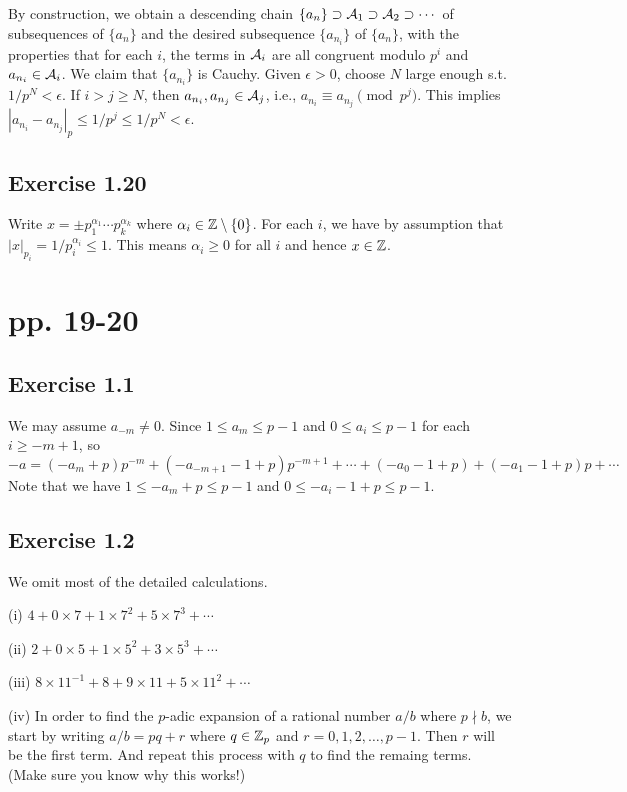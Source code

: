 \documentclass[../Koblitz.tex]{subfiles}
\begin{document}
By construction, we obtain a descending chain $\{a_n\}\supset\mathcal{A}_1\supset\mathcal{A}_2\supset\cdots$ of subsequences of $\{a_n\}$ and the desired subsequence $\{a_{n_i}\}$ of $\{a_n\}$, with the properties that for each $i$, the terms in $\mathcal{A}_i$ are all congruent modulo $p^i$ and $a_{n_i}\in\mathcal{A}_i$. We claim that $\{a_{n_i}\}$ is Cauchy. Given $\epsilon>0$, choose $N$ large enough s.t. $1/p^N<\epsilon$. If $i>j\geq N$, then $a_{n_i},a_{n_j}\in\mathcal{A}_j$, i.e., $a_{n_i}\equiv a_{n_j} \pmod{p^j}$. This implies $|a_{n_i}-a_{n_j}|_p \leq 1/p^j \leq 1/p^N < \epsilon$.

\subsection*{Exercise 1.20}

Write $x=\pm p_1^{\alpha_1}\cdots p_k^{\alpha_k}$ where $\alpha_i\in\mathbb{Z}\setminus\{0\}$. For each $i$, we have by assumption that $|x|_{p_i} = 1/p_i^{\alpha_i} \leq 1$. This means $\alpha_i \geq 0$ for all $i$ and hence $x\in\mathbb{Z}$.

\section*{pp. 19-20}

\subsection*{Exercise 1.1}
We may assume $a_{-m}\neq0$. Since $1\leq a_m \leq p-1$ and $0\leq a_i \leq p-1$ for each $i\geq-m+1$, so
$$-a = (-a_m+p)p^{-m}+(-a_{-m+1}-1+p)p^{-m+1}+\cdots+(-a_0-1+p)+(-a_1-1+p)p+\cdots$$
Note that we have $1\leq -a_m+p\leq p-1$ and $0\leq -a_i-1+p\leq p-1$.

\subsection*{Exercise 1.2}

We omit most of the detailed calculations.

(i) $4+0\times7+1\times7^2+5\times7^3+\cdots$

(ii) $2+0\times5+1\times5^2+3\times5^3+\cdots$

(iii) $8\times11^{-1}+8+9\times11+5\times11^2+\cdots$

(iv) In order to find the $p$-adic expansion of a rational number $a/b$ where $p\nmid b$, we start by writing $a/b=pq+r$ where $q\in\mathbb{Z}_p$ and $r=0,1,2,\ldots,p-1$. Then $r$ will be the first term. And repeat this process with $q$ to find the remaing terms. (Make sure you know why this works!)
\end{document}
